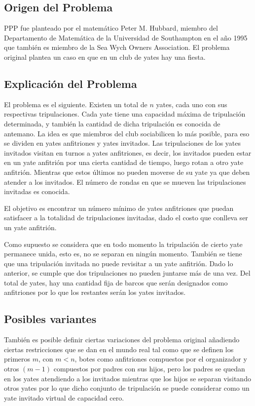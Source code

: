 \documentclass[letter, 10pt]{article}
\begin{document}
\subsection{Origen del Problema}
PPP fue planteado por el matemático Peter M. Hubbard\cite{Smith1996}, miembro del Departamento de Matemática de la Universidad de Southampton en el año 1995 que también es miembro de la Sea Wych Owners Association. El problema original plantea un caso en que en un club de yates hay una fiesta. 


\subsection{Explicación del Problema}
El problema es el siguiente. Existen un total de $n$ yates, cada uno con sus respectivas tripulaciones. Cada yate tiene una capacidad máxima de tripulación determinada, y también la cantidad de dicha tripulación es conocida de antemano. La idea es que miembros del club sociabilicen lo más posible, para eso se dividen en yates anfitriones y yates invitados. Las tripulaciones de los yates invitados visitan en turnos a yates anfitriones, es decir, los invitados pueden estar en un yate anfitrión por una cierta cantidad de tiempo, luego rotan a otro yate anfitrión. Mientras que estos últimos no pueden moverse de su yate ya que deben atender a los invitados. El número de rondas en que se mueven las tripulaciones invitadas es conocida.

El objetivo es encontrar un número mínimo de yates anfitriones que puedan satisfacer a la totalidad de tripulaciones invitadas, dado el costo que conlleva ser un yate anfitrión\cite{Smith1996}.

Como supuesto se considera que en todo momento la tripulación de cierto yate permanece unida, esto es, no se separan en ningún momento. También se tiene que una tripulación invitada no puede revisitar a un yate anfitrión. Dado lo anterior, se cumple que dos tripulaciones no pueden juntarse más de una vez. Del total de yates, hay una cantidad fija de barcos que serán designados como anfitriones por lo que los restantes serán los yates invitados.

\subsection{Posibles variantes}
También es posible definir ciertas variaciones del problema original añadiendo ciertas restricciones que se dan en el mundo real\cite{Kalvelagen20031713}\cite{Smith1996} tal como que se definen los primeros $m$, con $m<n$, botes como anfitriones compuestos por el organizador y otros $(m-1)$ compuestos por padres con sus hijos, pero los padres se quedan en los yates atendiendo a los invitados mientras que los hijos se separan visitando otros yates por lo que dicho conjunto de tripulación se puede considerar como un yate invitado virtual de capacidad cero.
\end{document}
